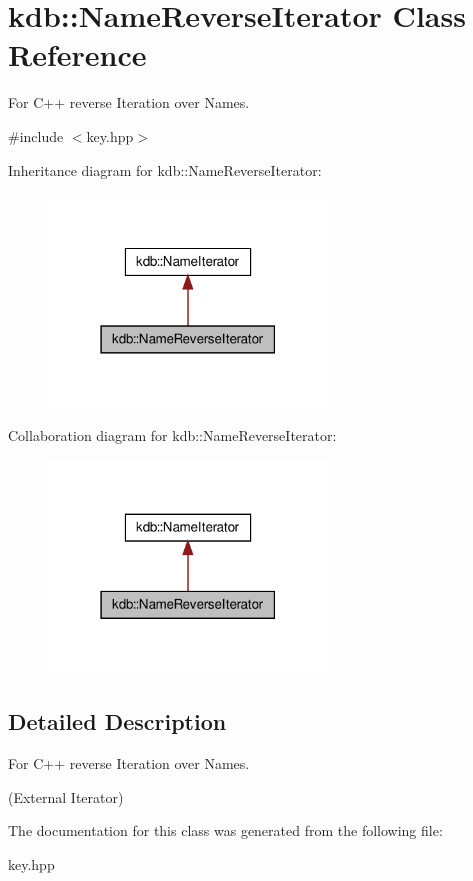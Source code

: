 \hypertarget{classkdb_1_1NameReverseIterator}{\section{kdb\-:\-:Name\-Reverse\-Iterator Class Reference}
\label{classkdb_1_1NameReverseIterator}
}


For C++ reverse Iteration over Names.  




{\ttfamily \#include $<$key.\-hpp$>$}



Inheritance diagram for kdb\-:\-:Name\-Reverse\-Iterator\-:
\nopagebreak
\begin{figure}[H]
\begin{center}
\leavevmode
\includegraphics[width=210pt]{classkdb_1_1NameReverseIterator__inherit__graph}
\end{center}
\end{figure}


Collaboration diagram for kdb\-:\-:Name\-Reverse\-Iterator\-:
\nopagebreak
\begin{figure}[H]
\begin{center}
\leavevmode
\includegraphics[width=210pt]{classkdb_1_1NameReverseIterator__coll__graph}
\end{center}
\end{figure}


\subsection{Detailed Description}
For C++ reverse Iteration over Names. 

(External Iterator) 

The documentation for this class was generated from the following file\-:\begin{DoxyCompactItemize}
\item 
key.\-hpp\end{DoxyCompactItemize}
